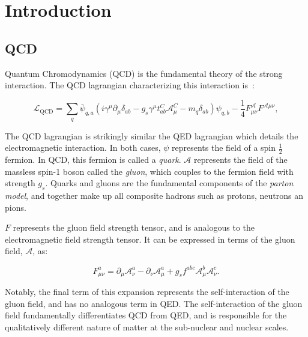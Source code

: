 





\chapter{Introduction}

\section{QCD}
\label{sec:QCD}
Quantum Chromodynamics (QCD) is the fundamental theory of the strong interaction. The QCD lagrangian characterizing this interaction is~\cite{and2010}:


\begin{equation}
  \mathcal{L}_\mathrm{QCD} = \sum_q \bar{\psi}_{q,a}\left(i\gamma^\mu\partial_\mu \delta_{ab} -g_s\gamma^\mu t^{C}_{ab} \mathcal{A}_\mu^C - m_q\delta_{ab}\right) \psi_{q,b} - \frac{1}{4}F^\mathcal{A}_{\mu\nu}F^{\mathcal{A}\mu\nu},
\label{eq:qcd_lagrangian}
\end{equation} 

The QCD lagrangian is strikingly similar the QED lagrangian which details the electromagnetic interaction. In both cases, $\psi$ represents the field of a spin $\frac{1}{2}$ fermion. In QCD, this fermion is called a \textit{quark}. $\mathcal{A}$ represents the field of the massless spin-1 boson called the \textit{gluon}, which couples to the fermion field with strength $g_s$. Quarks and gluons are the fundamental components of the \textit{parton model}, and together make up all composite hadrons such as protons, neutrons an pions.

$F$ represents the gluon field strength tensor, and is analogous to the electromagnetic field strength tensor. It can be expressed in terms of the gluon field, $\mathcal{A}$, as:

\begin{equation}
  F^a_{\mu \nu} = \partial_\mu \mathcal{A}^a_\nu - \partial_\nu \mathcal{A}^a_\mu + g_s f^{abc} \mathcal{A}^b_\mu \mathcal{A}^c_\nu.
\label{eq: gluon_tensor}
\end{equation}

Notably, the final term of this expansion represents the self-interaction of the gluon field, and has no analogous term in QED. The self-interaction of the gluon field fundamentally differentiates QCD from QED, and is responsible for the qualitatively different nature of matter at the sub-nuclear and nuclear scales.

